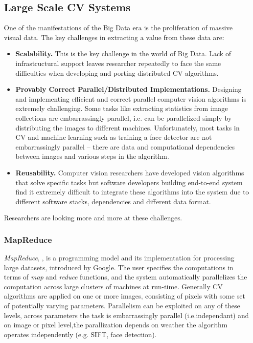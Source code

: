 \subsection{Large Scale CV Systems}
One of the manifestations of the Big Data era is the proliferation of massive visual data. The key challenges in extracting a value from these data are:
\begin{itemize}
\item{ {\bf Scalability.} This is the key challenge in the world of Big Data. Lack of infrastructural support leaves researcher repeatedly to face the same difficulties when developing and porting  distributed CV algorithms.}
\item{\bf Provably Correct Parallel/Distributed Implementations.} Designing and implementing
efficient and correct parallel computer vision algorithms is extremely challenging. Some tasks like extracting statistics from image collections are embarrassingly parallel, i.e. can be parallelized simply by distributing
the images to different machines. Unfortunately, most tasks in CV and
machine learning such as training a face detector are not embarrassingly parallel
– there are data and computational dependencies between images and various
steps in the algorithm.
\item{\bf Reusability.} Computer vision researchers have developed vision algorithms
that solve specific tasks but software developers building end-to-end system
find it extremely difficult to integrate these algorithms into the system due to
different software stacks, dependencies and different data format.
\end{itemize}
Researchers are looking more and more at these challenges.

\subsubsection{MapReduce}

{\em MapReduce}, \cite{Dean:2008}, is a programming model and its implementation for processing large datasets, introduced by Google. The user specifies the computations in terms of {\em map} and {\em reduce} functions, and the system automatically parallelizes the computation across large clusters of machines at run-time. Generally CV algorithms are applied on one or more images, consisting of pixels with some set of potentially varying parameters. Parallelism can be exploited on any of these levels, across parameters the task is embarrassingly parallel (i.e.independant) and on image or pixel level,the parallization depends on weather the algorithm operates independently (e.g. SIFT, face detection).

